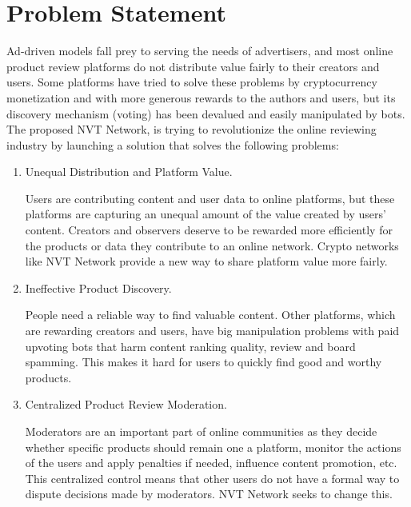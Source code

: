 
\chapter{Problem Statement} %

\label{Chapter2} %

Ad-driven models fall prey to serving the needs of advertisers, and most online product review platforms do not distribute value fairly to their creators and users. Some platforms have tried to solve these problems by cryptocurrency monetization and with more generous rewards to the authors and users, but its discovery mechanism (voting) has been devalued and easily manipulated by bots. The proposed NVT Network, is trying to revolutionize the online reviewing industry by launching a solution that solves the following problems:

\begin{enumerate}
\item Unequal Distribution and Platform Value.

Users are contributing content and user data to online platforms, but these platforms are capturing an unequal amount of the value created by users’ content. Creators and observers deserve to be rewarded more efficiently for the products or data they contribute to an online network. Crypto networks like NVT Network provide a new way to share platform value more fairly.

\item Ineffective Product Discovery.

People need a reliable way to find valuable content. Other platforms, which are rewarding creators and users, have big manipulation problems with paid upvoting bots that harm content ranking quality, review and board spamming. This makes it hard for users to quickly find good and worthy products.

\item Centralized Product Review Moderation.

Moderators are an important part of online communities as they decide whether specific products should remain one a platform, monitor the actions of the users and apply penalties if needed, influence content promotion, etc. This centralized control means that other users do not have a formal way to dispute decisions made by moderators. NVT Network seeks to change this.

\end{enumerate}


